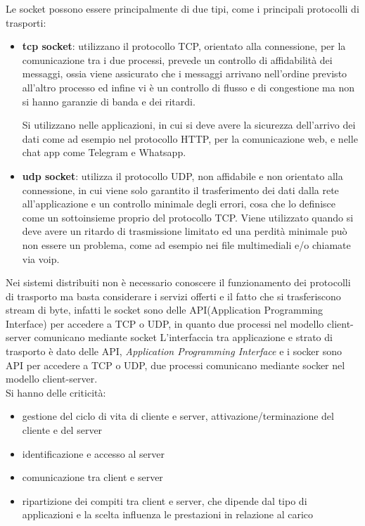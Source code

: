 \documentclass[a4paper,12pt, oneside]{book}
\begin{document}
Le socket possono essere principalmente di due tipi, come i principali protocolli di trasporti:
\begin{itemize}
    \item \textbf{tcp socket}: utilizzano il protocollo TCP, orientato alla connessione,
        per la comunicazione tra i due processi, prevede un controllo di affidabilità dei messaggi,
        ossia viene assicurato che i messaggi arrivano nell'ordine previsto all'altro processo
        ed infine vi è un controllo di flusso e di congestione ma non si hanno garanzie di banda e dei ritardi.

        Si utilizzano nelle applicazioni, in cui si deve avere la sicurezza dell'arrivo dei dati come ad
        esempio nel protocollo HTTP, per la comunicazione web, e nelle chat app come Telegram e Whatsapp.

    \item \textbf{udp socket}: utilizza il protocollo UDP, non affidabile e non orientato alla connessione,
        in cui viene solo garantito il trasferimento dei dati dalla rete all'applicazione e un controllo 
        minimale degli errori, cosa che lo definisce come un sottoinsieme proprio del protocollo TCP.\newline
        Viene utilizzato quando si deve avere un ritardo di trasmissione limitato ed una perdità minimale
        può non essere un problema, come ad esempio nei file multimediali e/o chiamate via voip.
\end{itemize}
Nei sistemi distribuiti non è necessario conoscere il funzionamento dei protocolli di trasporto ma basta
considerare i servizi offerti e il fatto che si trasferiscono stream di byte, infatti
le socket sono delle API(Application Programming Interface) per accedere a TCP o UDP, in quanto due processi
nel modello client-server comunicano mediante socket
L'interfaccia tra applicazione e strato di trasporto è dato delle API, \textit{Application Programming Interface}  e i socker sono API per accedere a TCP o UDP, due processi comunicano mediante socker nel modello client-server.\\
Si hanno delle criticità:
\begin{itemize}
\item gestione del ciclo di vita di cliente e server, attivazione/terminazione del cliente e del server
\item identificazione e accesso al server
\item comunicazione tra client e server
\item ripartizione dei compiti tra client e server, che dipende dal tipo di applicazioni e la scelta influenza le prestazioni in relazione al carico
\end{itemize}
\end{document}
